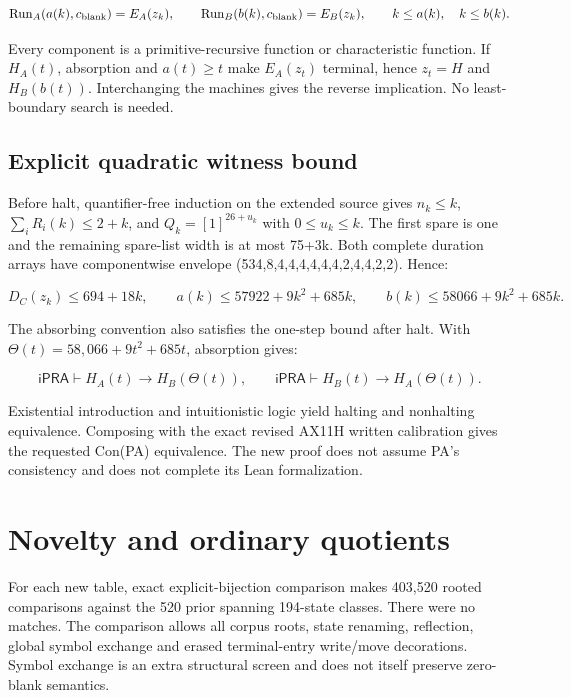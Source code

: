 \documentclass[10pt,a4paper]{article}
\begin{document}
\[
\operatorname{Run}_A(a(k),c_{\rm blank})=E_A(z_k),\qquad
\operatorname{Run}_B(b(k),c_{\rm blank})=E_B(z_k),\qquad
k\leq a(k),\quad k\leq b(k).
\]

Every component is a primitive-recursive function or characteristic function. If \(H_A(t)\), absorption and \(a(t)\ge t\) make \(E_A(z_t)\) terminal, hence \(z_t=H\) and \(H_B(b(t))\). Interchanging the machines gives the reverse implication. No least-boundary search is needed.

\subsection{Explicit quadratic witness bound}\label{explicit-quadratic-witness-bound}

Before halt, quantifier-free induction on the extended source gives \(n_k\le k\), \(\sum_i R_i(k)\le 2+k\), and \(Q_k=[1]^{26+u_k}\) with \(0\le u_k\le k\). The first spare is one and the remaining spare-list width is at most 75+3k. Both complete duration arrays have componentwise envelope (534,8,4,4,4,4,4,4,2,4,4,2,2). Hence:

\[
D_C(z_k)\leq 694+18k,\qquad
a(k)\leq57922+9k^2+685k,\qquad
b(k)\leq58066+9k^2+685k.
\]

The absorbing convention also satisfies the one-step bound after halt. With \(\Theta(t)=58{,}066+9t^2+685t\), absorption gives:

\[
\mathsf{iPRA}\vdash H_A(t)\to H_B(\Theta(t)),\qquad
\mathsf{iPRA}\vdash H_B(t)\to H_A(\Theta(t)).
\]

Existential introduction and intuitionistic logic yield halting and nonhalting equivalence. Composing with the exact revised AX11H written calibration gives the requested Con(PA) equivalence. The new proof does not assume PA's consistency and does not complete its Lean formalization.

\section{Novelty and ordinary quotients}\label{novelty-and-ordinary-quotients}

For each new table, exact explicit-bijection comparison makes 403,520 rooted comparisons against the 520 prior spanning 194-state classes. There were no matches. The comparison allows all corpus roots, state renaming, reflection, global symbol exchange and erased terminal-entry write/move decorations. Symbol exchange is an extra structural screen and does not itself preserve zero-blank semantics.
\end{document}

